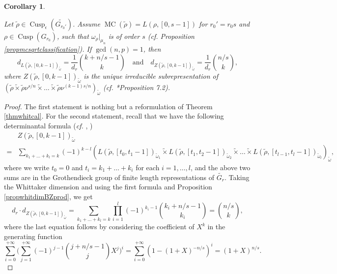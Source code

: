 \documentclass{amsart}
\numberwithin{equation}{section}
\newtheorem{corollary}[theorem]{\bf{Corollary}}
\newcommand{\rest}{\lvert}
\newcommand{\mrgcd}{\operatorname{gcd}}
\newcommand{\mrcusp}{\operatorname{Cusp}}
\newcommand{\mrmc}{\operatorname{MC}}
\newcommand{\wt}[1]{\widetilde{#1}}
\begin{document}
		\begin{corollary}\label{corwhitdimLZ}
			
			Let $\wt{\rho}\in\mrcusp_{\epsilon}(\wt{G_{r_{0}'}})$. Assume $\mrmc(\wt{\rho})=L(\rho,[0,s-1])$ for $r_{0}'=r_{0}s$ and $\rho\in\mrcusp(G_{r_{0}})$, such that $\omega_{\rho}\rest_{\mu_{n}}$ is of order $s$ (\emph{cf.} Proposition \ref{propmcsqrtclassification}). If $\mrgcd(n,p)=1$, then $$d_{L(\wt{\rho},[0,k-1])_{\wt{\omega}}}=\frac{1}{d_{r}}\binom{k+n/s-1}{k}\quad\text{and}\quad d_{Z(\wt{\rho},[0,k-1])_{\wt{\omega}}}=\frac{1}{d_{r}}\binom{n/s}{k},$$
			where $Z(\wt{\rho},[0,k-1])_{\wt{\omega}}$ is the unique irreducible subrepresentation of $(\wt{\rho}\wt{\times}\wt{\rho}\nu^{s/n}\wt{\times}\dots\wt{\times}\wt{\rho}\nu^{(k-1)s/n})_{\wt{\omega}}$ (\emph{cf.} \cite{kaplan2022classification}*{Proposition 7.2}).
			
		\end{corollary}
		
		\begin{proof}
			
			The first statement is nothing but a reformulation of Theorem \ref{thmwhitcal}. For the second statement, recall that we have the following determinantal formula (\emph{cf.} \cite{kaplan2022classification}, \cite{lapid2014determinantal})
			\begin{align*}
				&Z(\wt{\rho},[0,k-1])_{\wt{\omega}}\\
				=&\sum_{k_{1}+\dots+k_{l}=k}(-1)^{k-l}(L(\wt{\rho},[t_{0},t_{1}-1])_{\wt{\omega}_{1}}\wt{\times}L(\wt{\rho},[t_{1},t_{2}-1])_{\wt{\omega}_{2}}\wt{\times}\dots\wt{\times}L(\wt{\rho},[t_{l-1},t_{l}-1])_{\wt{\omega}_{l}})_{\wt{\omega}},
			\end{align*}
			where we write $t_{0}=0$ and $t_{i}=k_{1}+\dots+k_{i}$ for each $i=1,\dots,l$, and the above two sums are in the Grothendieck group of finite length representations of $\wt{G_{r}}$. Taking the Whittaker dimension and using the first formula and Proposition \ref{propwhitdimBZprod}, we get
			$$d_{r}\cdot d_{Z(\wt{\rho},[0,k-1])_{\wt{\omega}}}=\sum_{k_{1}+\dots+k_{l}=k}\prod_{i=1}^{l}(-1)^{k_{i}-1}\binom{k_{i}+n/s-1}{k_{i}}=\binom{n/s}{k},$$
			where the last equation follows by considering the coefficient of $X^{k}$ in the generating function
			$$\sum_{i=0}^{+\infty}\big(\sum_{j=1}^{+\infty}(-1)^{j-1}\binom{j+n/s-1}{j}X^{j}\big)^{i}=\sum_{i=0}^{+\infty}(1-(1+X)^{-n/s})^{i}=(1+X)^{n/s}.$$
			
		\end{proof}
		
\end{document}
